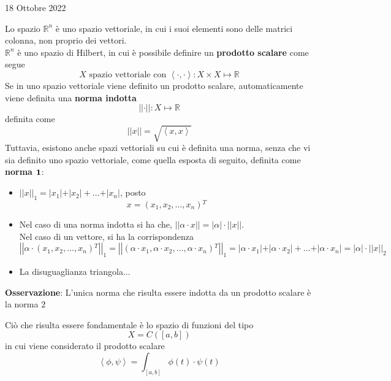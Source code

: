 \documentclass[a4paper]{extarticle}
\begin{document}
\newpage
\begin{center}
    18 Ottobre 2022
\end{center}
Lo spazio $\mathbb{R}^n$ è uno spazio vettoriale, in cui i suoi elementi sono delle matrici colonna, non proprio dei vettori.\\
$\mathbb{R}^n$ è uno spazio di Hilbert, in cui è possibile definire un \textbf{prodotto scalare} come segue
\[X \text{ spazio vettoriale con } \left<\cdot,\cdot\right> : X \times X \longmapsto \mathbb{R}\]
Se in uno spazio vettoriale viene definito un prodotto scalare, automaticamente viene definita una \textbf{norma indotta}
\[\left \vert \left \vert \cdot \right \vert \right \vert : X \longmapsto \mathbb{R}\]
definita come
\[\left \vert \left \vert x \right \vert \right \vert = \sqrt{\left<x,x\right>}\]
Tuttavia, esistono anche spazi vettoriali su cui è definita una norma, senza che vi sia definito uno spazio vettoriale, come quella esposta di seguito, definita come \textbf{norma $\bf{1}$}: 
\begin{itemize}
    \item $\left \vert \left \vert x \right \vert \right \vert_1 = \vert x_1 \vert + \vert x_2 \vert + \dots + \vert x_n \vert$, posto
    \[x=(x_1,x_2,\dots,x_n){^T}\]
    \item Nel caso di una norma indotta si ha che, $\left \vert \left \vert \alpha \cdot x \right \vert \right \vert = \vert \alpha \vert \cdot \left \vert \left \vert x \right \vert \right \vert$.\\
    Nel caso di un vettore, si ha la corrispondenza
    \[\left \vert \left \vert \alpha \cdot (x_1,x_2,\dots,x_n){^T} \right \vert \right \vert_1 = \left \vert \left \vert (\alpha \cdot x_1, \alpha \cdot x_2, \dots, \alpha \cdot x_n){^T} \right \vert \right \vert_1 = \vert \alpha \cdot x_1 \vert + \vert \alpha \cdot x_2 \vert + \dots + \vert \alpha \cdot x_n \vert = \vert \alpha \vert \cdot \left \vert \left \vert x \right \vert \right \vert_2\]
    \item La disuguaglianza triangola...
\end{itemize}

\vspace{1em}
\noindent
\textbf{Osservazione}: L'unica norma che risulta essere indotta da un prodotto scalare è la norma $2$

\vspace{1em}
\noindent
Ciò che risulta essere fondamentale è lo spazio di funzioni del tipo
\[X = C \left([a,b]\right)\]
in cui viene considerato il prodotto scalare
\[\left<\phi,\psi\right> = \int_{[a,b]} \phi(t) \cdot \psi(t)\]
\end{document}
